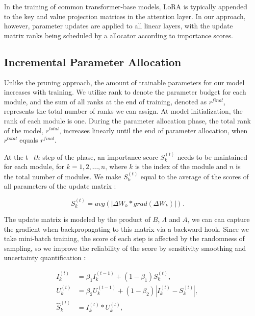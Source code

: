 In the training of common transformer-base models, LoRA is typically appended to the key and value projection matrices in the attention layer. In our approach, however, parameter updates are applied to all linear layers, with the update matrix ranks being scheduled by a allocator according to importance scores.

\subsection{Incremental Parameter Allocation} Unlike the pruning approach, the amount of trainable parameters for our model increases with training. We utilize rank to denote the parameter budget for each module, and the sum of all ranks at the end of training, denoted as $r^{final}$, represents the total number of ranks we can assign. At model initialization, the rank of each module is one. During the parameter allocation phase, the total rank of the model, $r^{total}$, increases linearly until the end of parameter allocation, when $r^{total}$ equals $r^{final}$.

At the t$-th$ step of the phase, an importance score $S^{\left( t \right)}_k$ needs to be maintained for each module, for $k=1,2,...,n$, where $k$ is the index of the module and $n$ is the total number of modules. We make $S^{\left( t \right)}_k$ equal to the average of the scores of all parameters of the update matrix \cite{c:22}:

\begin{equation}
\label{eq:5}
S^{\left( t \right)}_k = avg\left( \left| \Delta W_k * grad\left( \Delta W_k \right) \right| \right) .
\end{equation}

The update matrix is modeled by the product of $B$, $\Lambda$ and $A$, we can can capture the gradient when backpropagating to this matrix via a backward hook. Since we take mini-batch training, the score of each step is affected by the randomness of sampling, so we improve the reliability of the score by sensitivity smoothing and uncertainty quantification \cite{c:23}:

\begin{align}
\label{eq:6}
I_{k}^{\left( t \right)}   & =\beta_1 I_{k}^{\left( t-1 \right)}+\left( 1-\beta _1 \right) S_{k}^{\left( t \right)}, \\
\label{eq:7}
U_{k}^{\left( t \right)}   & =\beta_2 U_{k}^{\left( t-1 \right)}+\left( 1-\beta_2 \right) \left| I_{k}^{\left( t \right)} - S_{k}^{\left( t \right)}\right|, \\
\label{eq:8}
\hat{S}_{k}^{\left( t \right)} & =I_{k}^{\left( t \right)}*U_{k}^{\left( t \right)},
\end{align}

